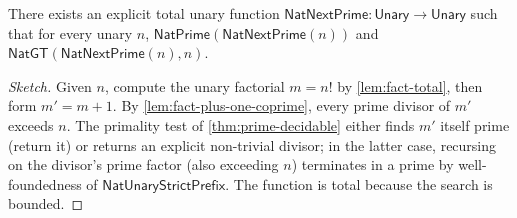 \begin{theorem}
\label{thm:euclid-infinite}
There exists an explicit total unary function \(\mathsf{NatNextPrime} : \mathsf{Unary} \to \mathsf{Unary}\) such that for every unary \(n\), \(\mathsf{NatPrime}(\mathsf{NatNextPrime}(n))\) and \(\mathsf{NatGT}(\mathsf{NatNextPrime}(n), n)\).
\end{theorem}
\begin{proof}[Sketch]
Given \(n\), compute the unary factorial \(m = n!\) by \autoref{lem:fact-total}, then form \(m' = m + 1\). By \autoref{lem:fact-plus-one-coprime}, every prime divisor of \(m'\) exceeds \(n\). The primality test of \autoref{thm:prime-decidable} either finds \(m'\) itself prime (return it) or returns an explicit non-trivial divisor; in the latter case, recursing on the divisor's prime factor (also exceeding \(n\)) terminates in a prime by well-foundedness of \(\mathsf{NatUnaryStrictPrefix}\). The function is total because the search is bounded.
\end{proof}

